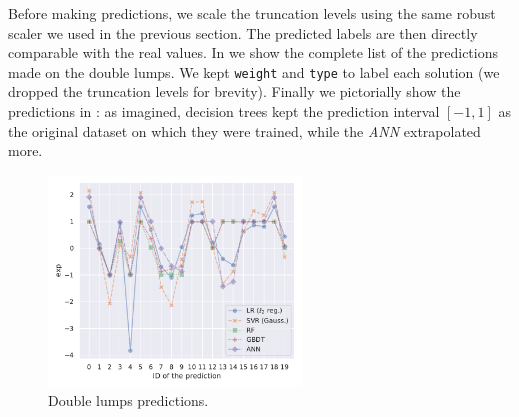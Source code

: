 Before making predictions, we scale the truncation levels using the same robust scaler we used in the previous section.
The predicted labels are then directly comparable with the real values.
In  we show the complete list of the predictions made on the double lumps.\footnotemark{}
We kept \texttt{weight} and \texttt{type} to label each solution (we dropped the truncation levels for brevity).
Finally we pictorially show the predictions in : as imagined, decision trees kept the prediction interval $[-1, 1]$ as the original dataset on which they were trained, while the \emph{ANN} extrapolated more.

\begin{figure}[htbp]
  \centering
  \includegraphics[width=0.6\textwidth]{img/dlumps_pred}
  \caption{Double lumps predictions.}
  \label{fig:lumps:dlump_preds}
\end{figure}

